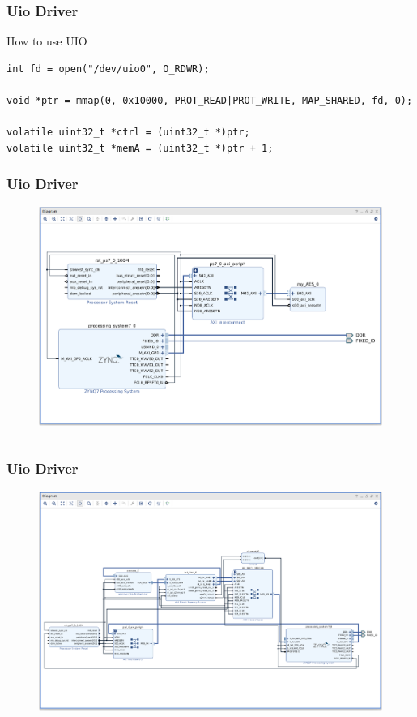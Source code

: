 \documentclass{beamer}
\begin{document}
\begin{frame}[fragile]
\frametitle{Uio Driver}
\centering How to use UIO\\
\begin{verbatim}
int fd = open("/dev/uio0", O_RDWR);

void *ptr = mmap(0, 0x10000, PROT_READ|PROT_WRITE, MAP_SHARED, fd, 0);

volatile uint32_t *ctrl = (uint32_t *)ptr;
volatile uint32_t *memA = (uint32_t *)ptr + 1;
\end{verbatim}
\end{frame}



\begin{frame}[fragile]
\frametitle{Uio Driver}
\begin{figure}
\centering\includegraphics[scale=0.2]{vivado-tinyaes.png}
\end{figure}
\begin{verbatim}
\end{verbatim}
\end{frame}

\begin{frame}[fragile]
\frametitle{Uio Driver}
\begin{figure}
\centering\includegraphics[scale=0.25]{vivado-ecc.png}
\end{figure}
\begin{verbatim}
\end{verbatim}
\end{frame}
\end{document}
